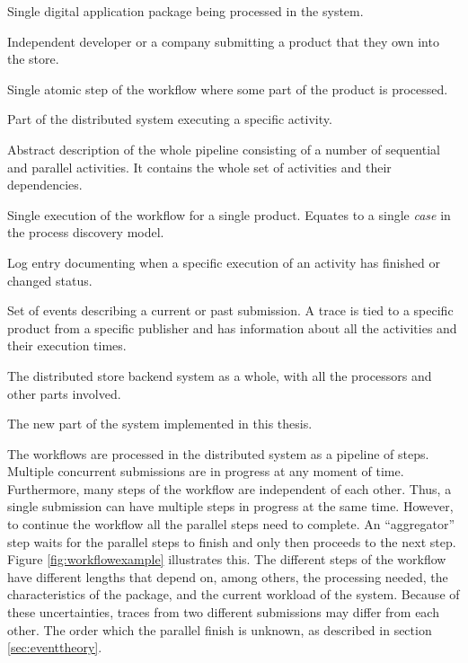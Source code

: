 \begin{description}[style=nextline]
\item[Product] 
Single digital application package being processed in the system. 

\item[Publisher] 
Independent developer or a company submitting a product that they own into the store.

\item[Activity] 
Single atomic step of the workflow where some part of the product is processed. 

\item[Processor] 
Part of the distributed system executing a specific activity.

\item[Workflow]
Abstract description of the whole pipeline consisting of a number of sequential and parallel activities. It contains the whole set of activities and their dependencies.

\item[Submission] 
Single execution of the workflow for a single product. Equates to a single \emph{case} in the process discovery model.

\item[Event] 
Log entry documenting when a specific execution of an activity has finished or changed status. 

\item[Trace] 
Set of events describing a current or past submission. 
A trace is tied to a specific product from a specific publisher and has information about all the activities and their execution times. 

\item[System] 
The distributed store backend system as a whole, with all the processors and other parts involved.

\item[Project] 
The new part of the system implemented in this thesis.

\label{desc:termdefinitions}
\end{description}


The workflows are processed in the distributed system as a pipeline of steps. 
Multiple concurrent submissions are in progress at any moment of time.
Furthermore, many steps of the workflow are independent of each other.
Thus, a single submission can have multiple steps in progress at the same time.
However, to continue the workflow all the parallel steps need to complete.
An ``aggregator'' step waits for the parallel steps to finish and only then proceeds to the next step. 
Figure \ref{fig:workflowexample} illustrates this.
The different steps of the workflow have different lengths that depend on, among others,
the processing needed, the characteristics of the package, and the current workload of the system.
Because of these uncertainties, traces from two different submissions may differ from each other.
The order which the parallel finish is unknown, as described in section \ref{sec:eventtheory}.

